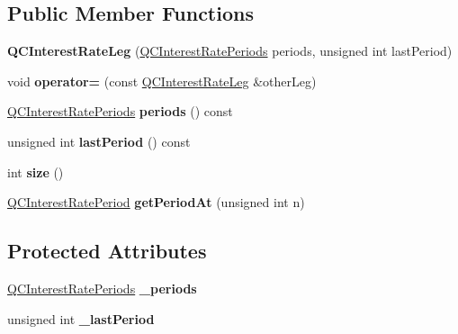 \subsection*{Public Member Functions}
\begin{DoxyCompactItemize}
\item 
\hypertarget{class_q_c_interest_rate_leg_a90202127d47b1a5870a0dd280547d562}{{\bfseries Q\+C\+Interest\+Rate\+Leg} (\hyperlink{class_q_c_interest_rate_leg_ad04f1da06a7b5d44fea906bd8c62de28}{Q\+C\+Interest\+Rate\+Periods} periods, unsigned int last\+Period)}\label{class_q_c_interest_rate_leg_a90202127d47b1a5870a0dd280547d562}

\item 
\hypertarget{class_q_c_interest_rate_leg_a901ff040ce1c9164048b8ff34cbedec6}{void {\bfseries operator=} (const \hyperlink{class_q_c_interest_rate_leg}{Q\+C\+Interest\+Rate\+Leg} \&other\+Leg)}\label{class_q_c_interest_rate_leg_a901ff040ce1c9164048b8ff34cbedec6}

\item 
\hypertarget{class_q_c_interest_rate_leg_ab36ec513dc5f4885c94ddb254bc281d2}{\hyperlink{class_q_c_interest_rate_leg_ad04f1da06a7b5d44fea906bd8c62de28}{Q\+C\+Interest\+Rate\+Periods} {\bfseries periods} () const }\label{class_q_c_interest_rate_leg_ab36ec513dc5f4885c94ddb254bc281d2}

\item 
\hypertarget{class_q_c_interest_rate_leg_ab654717a569e2ea94059e608da652e5c}{unsigned int {\bfseries last\+Period} () const }\label{class_q_c_interest_rate_leg_ab654717a569e2ea94059e608da652e5c}

\item 
\hypertarget{class_q_c_interest_rate_leg_a63d48a798d9be1b4594ff8c1d85f0bfd}{int {\bfseries size} ()}\label{class_q_c_interest_rate_leg_a63d48a798d9be1b4594ff8c1d85f0bfd}

\item 
\hypertarget{class_q_c_interest_rate_leg_a6a5f6488229e70df8ec55be71ee25aa1}{\hyperlink{class_q_c_interest_rate_leg_af680c8ddf16eba5370b8a71c60955f98}{Q\+C\+Interest\+Rate\+Period} {\bfseries get\+Period\+At} (unsigned int n)}\label{class_q_c_interest_rate_leg_a6a5f6488229e70df8ec55be71ee25aa1}

\end{DoxyCompactItemize}
\subsection*{Protected Attributes}
\begin{DoxyCompactItemize}
\item 
\hypertarget{class_q_c_interest_rate_leg_a826af813e969114999146cec41397d2c}{\hyperlink{class_q_c_interest_rate_leg_ad04f1da06a7b5d44fea906bd8c62de28}{Q\+C\+Interest\+Rate\+Periods} {\bfseries \+\_\+periods}}\label{class_q_c_interest_rate_leg_a826af813e969114999146cec41397d2c}

\item 
\hypertarget{class_q_c_interest_rate_leg_a0bc3c3d0efa4f055218688136fc9908e}{unsigned int {\bfseries \+\_\+last\+Period}}\label{class_q_c_interest_rate_leg_a0bc3c3d0efa4f055218688136fc9908e}

\end{DoxyCompactItemize}


